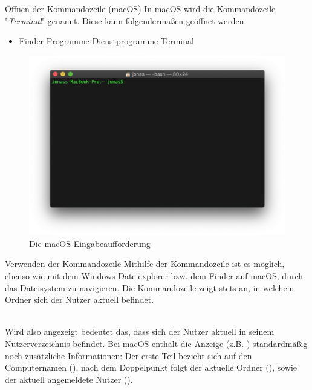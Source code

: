     \begin{frame}{Öffnen der Kommandozeile (macOS)}
        In macOS wird die Kommandozeile "\textit{Terminal}" genannt. Diese kann folgendermaßen geöffnet werden:
        
        \begin{itemize}
            \item Finder \textrightarrow Programme \textrightarrow Dienstprogramme \textrightarrow Terminal
        \end{itemize}
        
        \begin{figure}
            \centering
            \includegraphics[width=0.8\linewidth,height=0.5\textheight,keepaspectratio]{chapters/05_command_line/figures/cmd_mac.png}
            \caption{Die macOS-Eingabeaufforderung}
        \end{figure}
    \end{frame}

    \begin{frame}{Verwenden der Kommandozeile}
        Mithilfe der Kommandozeile ist es möglich, ebenso wie mit dem Windows Dateiexplorer bzw. dem Finder auf macOS, durch das Dateisystem zu navigieren.
        Die Kommandozeile zeigt stets an, in welchem Ordner sich der Nutzer aktuell befindet. \\~\
        
        Wird also angezeigt  bedeutet das, dass sich der Nutzer aktuell in seinem Nutzerverzeichnis befindet. Bei macOS enthält die Anzeige (z.B. ) standardmäßig noch zusätzliche Informationen: Der erste Teil bezieht sich auf den Computernamen (), nach dem Doppelpunkt folgt der aktuelle Ordner (\code{$\sim$}), sowie der aktuell angemeldete Nutzer ().
    \end{frame}
    
